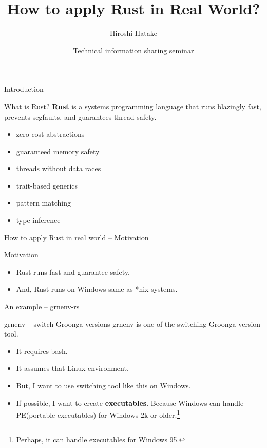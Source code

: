 \documentclass[12pt, unicode]{beamer}
\title{How to apply Rust in Real World?}
\author{Hiroshi Hatake}
\date[2016/03/12]{Technical information sharing seminar}
\begin{document}
\frame{\maketitle}

\begin{frame}{Introduction}
\begin{block}{What is Rust?}
\textbf{Rust} is a systems programming language that runs blazingly fast, prevents segfaults, and guarantees thread safety.
\end{block}
\begin{itemize}
\item<2-> zero-cost abstractions
\item<3-> guaranteed memory safety
\item<4-> threads without data races
\item<5-> trait-based generics
\item<6-> pattern matching
\item<7-> type inference
\end{itemize}
\end{frame}

\begin{frame}{How to apply Rust in real world -- Motivation}
  \begin{block}{Motivation}
  \begin{itemize}
  \item<1-> Rust runs fast and guarantee safety.
  \item<2-> And, Rust runs on Windows same as *nix systems.
  \end{itemize}
  \end{block}
\end{frame}

\begin{frame}{An example -- grnenv-rs}
\begin{block}{grnenv -- switch Groonga versions}
grnenv is one of the switching Groonga version tool.
\end{block}
\begin{itemize}
\item<2-> It requires bash.
\item<3-> It assumes that Linux environment.
\item<4-> But, I want to use switching tool like this on Windows.
\item<5-> If possible, I want to create \textbf {executables}. Because Windows can handle PE(portable executables) for Windows 2k or older.\footnote[frame]{Perhaps, it can handle executables for Windows 95.}
\end{itemize}
\end{frame}
\end{document}
